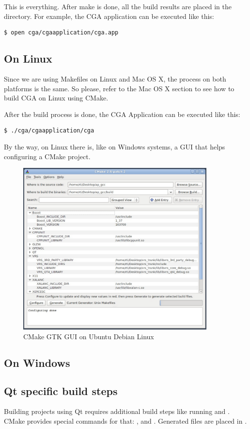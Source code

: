 This is everything. After make is done, all the build results are placed in the  directory. For example, the CGA application can be executed like this:
\begin{verbatim}
$ open cga/cgaapplication/cga.app
\end{verbatim}

\subsection{On Linux} Since we are using Makefiles on Linux and Mac OS X, the process on both platforms is the same. So please, refer to the Mac OS X section to see how to build CGA on Linux using CMake.

After the build process is done, the CGA Application can be executed like this:
\begin{verbatim}
$ ./cga/cgaapplication/cga
\end{verbatim}

By the way, on Linux there is, like on Windows systems, a GUI that helps configuring a CMake project.

\begin{figure}[ht]
\centering
\includegraphics[width=10cm]{images/cmake_gui_linux}
\caption{CMake GTK GUI on Ubuntu Debian Linux}\label{fig:cmake_gui_linux}
\end{figure}


\subsection{On Windows}


\subsection{Qt specific build steps} Building projects using Qt requires additional build steps like running  and . CMake provides special commands for that: ,  and . Generated files are placed in .

